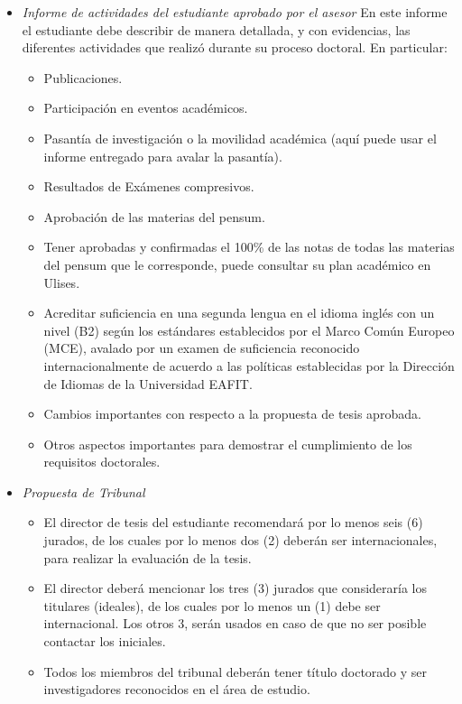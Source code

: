 \begin{itemize}
    \item \emph{Informe de actividades del estudiante aprobado por el asesor} En este informe el estudiante debe describir de manera detallada, y con evidencias, las diferentes actividades que realizó durante su proceso doctoral.  En particular: 
     \begin{itemize}
            \item Publicaciones.
            \item Participación en eventos académicos.
            \item Pasantía de investigación o la movilidad académica (aquí puede usar el informe entregado para avalar la pasantía).
            \item Resultados de Exámenes compresivos.
            \item Aprobación de las materias del pensum.
            \item Tener aprobadas y confirmadas el 100\% de las notas de todas las materias del pensum que le corresponde, puede consultar su plan académico en Ulises.
            \item Acreditar suficiencia en una segunda lengua en el idioma inglés con un nivel (B2) según los estándares establecidos por el Marco Común Europeo (MCE), avalado por un examen de suficiencia reconocido internacionalmente de acuerdo a las políticas establecidas por la Dirección de Idiomas de la Universidad EAFIT.
            \item Cambios importantes con respecto a la propuesta de tesis aprobada.
            \item Otros aspectos importantes para demostrar el cumplimiento de los requisitos doctorales.
    \end{itemize}
    
    \item \emph{Propuesta de Tribunal}
    \begin{itemize}
        \item El director de tesis del estudiante recomendará por lo menos seis (6) jurados, de los cuales por lo menos dos (2) deberán ser internacionales, para realizar la evaluación de la tesis.
        \item El director deberá mencionar los tres (3) jurados que consideraría los titulares (ideales), de los cuales por lo menos un (1) debe ser internacional.  Los otros 3, serán usados en caso de que no ser posible contactar los iniciales. 
        \item Todos los miembros del tribunal deberán tener título doctorado y ser investigadores reconocidos en el área de estudio.
    \end{itemize}
    
\end{itemize}

